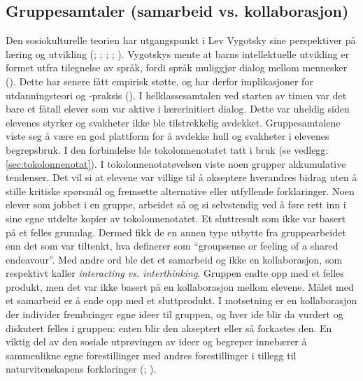 \documentclass[main.tex]{subfiles}
\begin{document}
\subsection*{Gruppesamtaler (samarbeid vs. kollaborasjon)}
Den sosiokulturelle teorien har utgangspunkt i Lev Vygotsky sine perspektiver på læring og 
utvikling (; ; ; 
; ). Vygotskys 
mente at barns intellektuelle utvikling er formet utfra tilegnelse av språk, fordi språk 
muliggjør dialog mellom mennesker (). Dette har senere fått empirisk
støtte, og har derfor implikasjoner for utdanningsteori og -praksis ().
\newline
\newline
I helklassesamtalen ved starten av timen var det bare et fåtall elever som var aktive i lærerinitiert 
dialog. Dette var uheldig siden elevenes styrker og svakheter ikke ble tilstrekkelig avdekket. 
Gruppesamtalene viste seg å være en god plattform for å avdekke hull og svakheter i elevenes 
begrepsbruk. I den forbindelse ble tokolonnenotatet tatt i bruk (se vedlegg: \ref{sec:tokolonnenotat}).
\newline
\newline
I tokolonnenotatøvelsen viste noen grupper akkumulative tendenser. Det vil si at elevene 
var villige til å akseptere hverandres bidrag uten å stille kritiske spørsmål og fremsette
alternative eller utfyllende forklaringer. Noen elever som jobbet i en gruppe, arbeidet så og si
selvstendig ved å føre rett inn i sine egne utdelte kopier av tokolonnenotatet. Et sluttresult som 
ikke var basert på et felles grunnlag. Dermed fikk de en annen type utbytte fra gruppearbeidet
enn det som var tiltenkt, hva   definerer som ``groupsense or feeling of a shared endeavour''. 
Med andre ord ble det et samarbeid og ikke en kollaborasjon, som  respektivt kaller 
\emph{interacting vs. interthinking}. Gruppen endte opp med et felles produkt, men det var ikke 
basert på en kollaborasjon mellom elevene. Målet med et samarbeid er å ende opp med et sluttprodukt. 
I motsetning er en kollaborasjon der individer frembringer egne ideer til gruppen, og hver ide
blir da vurdert og diskutert felles i gruppen: enten blir den akseptert eller så forkastes den.
En viktig del av den sosiale utprøvingen av ideer og begreper innebærer å sammenlikne egne 
forestillinger med andres forestillinger i tillegg til naturvitenskapens forklaringer 
(; ).
\end{document}
